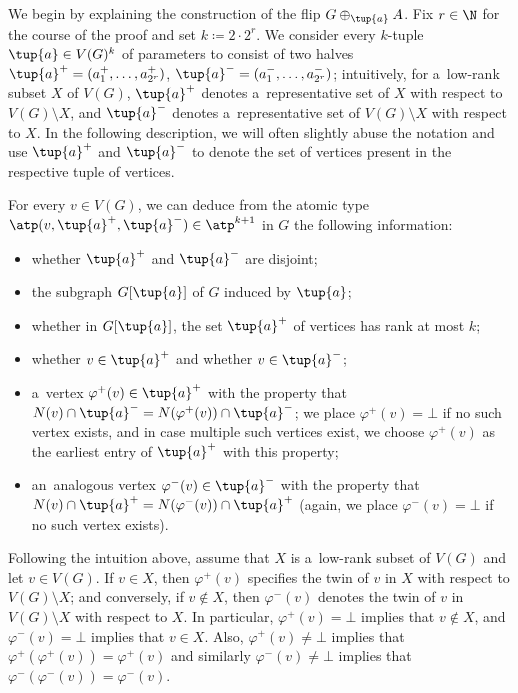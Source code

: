 \medskip

We begin by explaining the construction of the flip $G \oplus_{\tup{a}} A$.
Fix $r \in \N$ for the course of the proof and set $k \coloneqq 2 \cdot 2^r$.
We consider every $k$-tuple $\tup{a} \in V(G)^k$ of parameters to consist of two halves $\tup{a}^+ = (a^+_1, \ldots, a^+_{2^r})$, $\tup{a}^- = (a^-_1, \ldots, a^-_{2^r})$; intuitively, for a~low-rank subset $X$ of $V(G)$, $\tup{a}^+$ denotes a~representative set of $X$ with respect to $V(G) \setminus X$, and $\tup{a}^-$ denotes a~representative set of $V(G) \setminus X$ with respect to $X$.
In the following description, we will often slightly abuse the notation and use $\tup{a}^+$ and $\tup{a}^-$ to denote the set of vertices present in the respective tuple of vertices.

For every $v \in V(G)$, we can deduce from the atomic type $\atp(v, \tup{a}^+, \tup{a}^-) \in \atp^{k+1}$ in $G$ the following information:
\begin{itemize}[nosep]
    \item whether $\tup{a}^+$ and $\tup{a}^-$ are disjoint;
    \item the subgraph $G[\tup{a}]$ of $G$ induced by $\tup{a}$;
    \item whether in $G[\tup{a}]$, the set $\tup{a}^+$ of vertices has rank at most $k$;
    \item whether $v \in \tup{a}^+$ and whether $v \in \tup{a}^-$;
    \item a~vertex $\varphi^+(v) \in \tup{a}^+$ with the property that $N(v) \cap \tup{a}^- = N(\varphi^+(v)) \cap \tup{a}^-$; we place $\varphi^+(v) = \bot$ if no such vertex exists, and in case multiple such vertices exist, we choose $\varphi^+(v)$ as the earliest entry of $\tup{a}^+$ with this property;
    \item an~analogous vertex $\varphi^-(v) \in \tup{a}^-$ with the property that $N(v) \cap \tup{a}^+ = N(\varphi^-(v)) \cap \tup{a}^+$ (again, we place $\varphi^-(v) = \bot$ if no such vertex exists).
\end{itemize}
Following the intuition above, assume that $X$ is a~low-rank subset of $V(G)$ and let $v \in V(G)$.
If $v \in X$, then $\varphi^+(v)$ specifies the twin of $v$ in $X$ with respect to $V(G) \setminus X$; and conversely, if $v \notin X$, then $\varphi^-(v)$ denotes the twin of $v$ in $V(G) \setminus X$ with respect to $X$.
In particular, $\varphi^+(v) = \bot$ implies that $v \notin X$, and $\varphi^-(v) = \bot$ implies that $v \in X$.
Also, $\varphi^+(v) \neq \bot$ implies that $\varphi^+(\varphi^+(v)) = \varphi^+(v)$ and similarly $\varphi^-(v) \neq \bot$ implies that $\varphi^-(\varphi^-(v)) = \varphi^-(v)$.

